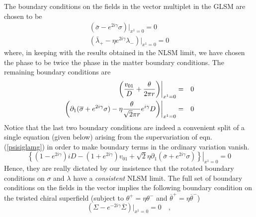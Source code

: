 \documentclass[a4paper,12pt]{article}
\begin{document}
The boundary conditions on the fields in the vector multiplet in the GLSM
are chosen to be 
\begin{eqnarray}
({\bar\sigma}-e^{2i\gamma}\sigma)|_{x^1=0}=0\\
({\bar\lambda_{+}}-\eta e^{2i\gamma}\lambda_{-})|_{x^1=0}=0
\label{psisiglamg}
\end{eqnarray}
where, in keeping with the results obtained in the NLSM limit,
we have chosen the phase to be twice  the phase in the matter boundary
conditions. The remaining boundary conditions are
\begin{eqnarray}
\left.\left({{v_{01}}\over{D}}+
{\theta\over{2\pi r}}\right)\right|_{x^1=0}&=&0\\
\left.\left(\partial_1(\overline{\sigma} + e^{2i\gamma} \sigma)
-\eta {{\theta}\over{\sqrt{2}\pi r}} 
e^{i\gamma} D\right)\right|_{x^1=0} &=&0
\end{eqnarray}
Notice that the last two boundary conditions are indeed
a convenient split of a single equation (given below) arising from the 
supervariation of eqn. (\ref{psisiglamg}) in order to make boundary terms 
in the ordinary variation vanish. 
\begin{equation}
\left.\left\{(1-e^{2i\gamma})iD-(1+e^{2i\gamma})v_{01}
+{\sqrt 2}\eta \partial_1({\bar \sigma}+e^{2i\gamma}\sigma)
\right\}\right|_{x^1=0}=0
\end{equation}
Hence, they are really dictated by our
insistence that the rotated boundary conditions on $\sigma$ and
$\lambda$ have a {\it consistent} NLSM limit.
The full set of boundary conditions on the fields in the vector
implies the following boundary condition on the twisted chiral
superfield (subject to $\theta^+ = \eta \theta^-$ and
$\overline{\theta}^+ = \eta \overline{\theta}^-$)
\begin{equation}
(\Sigma - e^{-2i\gamma} \overline{\Sigma})|_{x^1=0}=0\quad,
\label{twogamma}
\end{equation}
\end{document}
